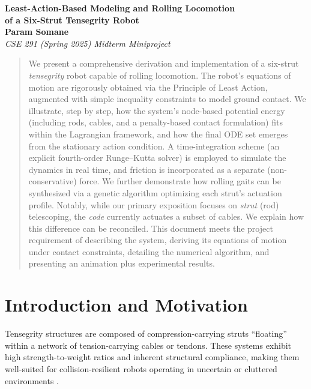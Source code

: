 \documentclass[12pt,letterpaper]{article}
\begin{document}
\begin{center}
    {\Large \textbf{Least-Action-Based Modeling and Rolling Locomotion \\ 
    of a Six-Strut Tensegrity Robot}}\\[10pt]
    \textbf{Param Somane}\\
    \emph{CSE 291 (Spring 2025) Midterm Miniproject}
\end{center}

\vspace{1em}

\begin{abstract}
\noindent
We present a comprehensive derivation and implementation of a six-strut \emph{tensegrity} robot capable of rolling locomotion. The robot's equations of motion are rigorously obtained via the Principle of Least Action, augmented with simple inequality constraints to model ground contact. We illustrate, step by step, how the system's node-based potential energy (including rods, cables, and a penalty-based contact formulation) fits within the Lagrangian framework, and how the final ODE set emerges from the stationary action condition. A time-integration scheme (an explicit fourth-order Runge--Kutta solver) is employed to simulate the dynamics in real time, and friction is incorporated as a separate (non-conservative) force. We further demonstrate how rolling gaits can be synthesized via a genetic algorithm optimizing each strut's actuation profile. Notably, while our primary exposition focuses on \emph{strut} (rod) telescoping, the \emph{code} currently actuates a subset of cables. We explain how this difference can be reconciled. This document meets the project requirement of describing the system, deriving its equations of motion under contact constraints, detailing the numerical algorithm, and presenting an animation plus experimental results.
\end{abstract}

\section{Introduction and Motivation}
Tensegrity structures are composed of compression-carrying struts ``floating'' within a network of tension-carrying cables or tendons. These systems exhibit high strength-to-weight ratios and inherent structural compliance, making them well-suited for collision-resilient robots operating in uncertain or cluttered environments \cite{SkeltonOliveira2014,ZhaWuDimickMueller2024,HiraiImuta2014ICCM,ZhaWuKroegerPerezMueller2020IROS}.
\end{document}
